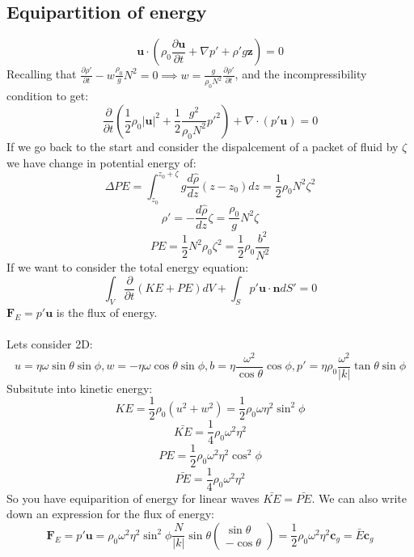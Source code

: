 \documentclass{article}
\begin{document}
\subsection{Equipartition of energy}
$$
\bm u \cdot (\rho_0 \frac{\partial \bm u}{\partial t} + \nabla p' + \rho' g \bm z) = 0
$$
Recalling that $\frac{\partial \rho'}{\partial t} - w \frac{\rho_0}{g} N^2 = 0 \implies w = \frac{g}{\rho_0 N^2} \frac{\partial \rho'}{\partial t}$, and the incompressibility condition to get:
$$
\frac{\partial}{\partial t}( \frac{1}{2} \rho_0 |\bm u |^2 + \frac{1}{2} \frac{g^2}{\rho_0 N^2} p'^2 ) + \nabla \cdot (p' \bm u) = 0
$$
If we go back to the start and consider the dispalcement of a packet of fluid by $\zeta$ we have change in potential energy of:
$$
\Delta PE = \int^{z_0 + \zeta}_{z_0} g \frac{d \hat \rho}{d z} (z - z_0) dz = \frac{1}{2} \rho_0 N^2 \zeta^2
$$
$$
\rho' = - \frac{d \hat \rho}{dz} \zeta = \frac{\rho_0}{g} N^2 \zeta 
$$
$$
PE = \frac{1}{2} N^2 \rho_0 \zeta^2 = \frac{1}{2} \rho_0 \frac{b^2}{N^2}
$$
If we want to consider the total energy equation:
$$
\int_V \frac{\partial}{\partial t} (KE + PE) dV + \int_S p' \bm u \cdot \bm n dS' = 0
$$
$\bm F_E = p'\bm u$ is the flux of energy.\\\\
Lets consider 2D:
$$
u = \eta \omega \sin \theta \sin \phi, w = - \eta \omega \cos \theta \sin \phi, b = \eta \frac{\omega^2}{\cos \theta} \cos \phi, p' = \eta \rho_0 \frac{\omega^2}{|k|} \tan \theta \sin \phi
$$
Subsitute into kinetic energy:
$$
KE = \frac{1}{2} \rho_0 (u^2 + w^2) = \frac{1}{2} \rho_0 \omega \eta^2 \sin^2 \phi
$$
$$
\bar{KE} = \frac{1}{4} \rho_0 \omega^2 \eta^2
$$
$$
PE = \frac{1}{2} \rho_0 \omega^2 \eta^2 \cos^2\phi
$$
$$
\bar{PE} = \frac{1}{4} \rho_0 \omega^2 \eta^2
$$
So you have equiparition of energy for linear waves $\bar{KE} = \bar{PE}$. We can also write down an expression for the flux of energy:
$$
\bm F_E = p' \bm u = \rho_0 \omega^2 \eta^2 \sin^2 \phi  \frac{N}{|k|} \sin \theta \begin{pmatrix} \sin \theta\\ - \cos \theta \end{pmatrix} = \frac{1}{2} \rho_0 \omega^2 \eta^2 \bm c_g = \bar{E} \bm c_g
$$
\end{document}
